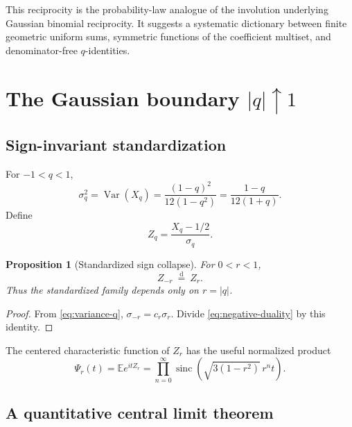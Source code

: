 \documentclass[11pt]{article}
\newtheorem{proposition}[theorem]{Proposition}
\theoremstyle{definition}
\newcommand{\E}{\mathbb E}
\newcommand{\sinc}{\operatorname{sinc}}
\newcommand{\Var}{\operatorname{Var}}
\newcommand{\doteqL}{\mathrel{\stackrel{\mathrm d}=}}
\begin{document}
This reciprocity is the probability-law analogue of the involution underlying Gaussian
binomial reciprocity.  It suggests a systematic dictionary between finite geometric
uniform sums, symmetric functions of the coefficient multiset, and denominator-free
$q$-identities.

\section{The Gaussian boundary \texorpdfstring{$\lvert q\rvert\uparrow1$}{|q| -> 1}}

\subsection{Sign-invariant standardization}

For \(-1<q<1\),
\begin{equation}
 \sigma_q^2=\Var(X_q)
 =\frac{(1-q)^2}{12(1-q^2)}
 =\frac{1-q}{12(1+q)}.                                    \label{eq:variance-q}
\end{equation}
Define
\begin{equation}
 Z_q=\frac{X_q-1/2}{\sigma_q}.                             \label{eq:Zq}
\end{equation}

\begin{proposition}[Standardized sign collapse]\label{prop:standard-sign}
For \(0<r<1\),
\begin{equation}
 \boxed{Z_{-r}\ \doteqL\ Z_r.}                           \label{eq:standard-sign}
\end{equation}
Thus the standardized family depends only on \(r=\lvert q\rvert\).
\end{proposition}

\begin{proof}
From \cref{eq:variance-q}, \(\sigma_{-r}=c_r\sigma_r\).  Divide
\cref{eq:negative-duality} by this identity.
\end{proof}

The centered characteristic function of \(Z_r\) has the useful normalized product
\begin{equation}
 \Psi_r(t)=\E e^{itZ_r}
 =\prod_{n=0}^{\infty}
 \sinc\!\left(\sqrt{3(1-r^2)}\,r^nt\right).              \label{eq:standardized-sinc}
\end{equation}

\subsection{A quantitative central limit theorem}
\end{document}
